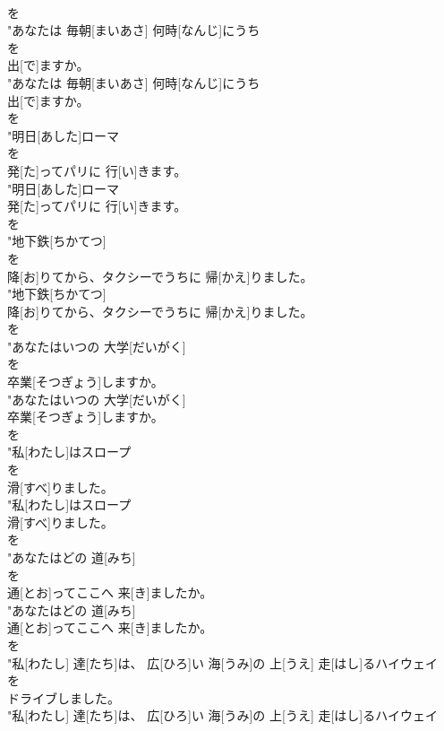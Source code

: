 \documentclass[8pt]{extreport}
\begin{document}
\begin{CJK}{UTF8}{min}
\\	を
\\	"あなたは 毎朝[まいあさ] 何時[なんじ]にうち
\\	を
\\	出[で]ますか。
\\	"あなたは 毎朝[まいあさ] 何時[なんじ]にうち
\\	出[で]ますか。
\\	を
\\	"明日[あした]ローマ
\\	を
\\	発[た]ってパリに 行[い]きます。
\\	"明日[あした]ローマ
\\	発[た]ってパリに 行[い]きます。
\\	を
\\	"地下鉄[ちかてつ]
\\	を
\\	降[お]りてから、タクシーでうちに 帰[かえ]りました。
\\	"地下鉄[ちかてつ]
\\	降[お]りてから、タクシーでうちに 帰[かえ]りました。
\\	を
\\	"あなたはいつの 大学[だいがく]
\\	を
\\	卒業[そつぎょう]しますか。
\\	"あなたはいつの 大学[だいがく]
\\	卒業[そつぎょう]しますか。
\\	を
\\	"私[わたし]はスロープ
\\	を
\\	滑[すべ]りました。
\\	"私[わたし]はスロープ
\\	滑[すべ]りました。
\\	を
\\	"あなたはどの 道[みち]
\\	を
\\	通[とお]ってここへ 来[き]ましたか。
\\	"あなたはどの 道[みち]
\\	通[とお]ってここへ 来[き]ましたか。
\\	を
\\	"私[わたし] 達[たち]は、 広[ひろ]い 海[うみ]の 上[うえ] 走[はし]るハイウェイ
\\	を
\\	ドライブしました。
\\	"私[わたし] 達[たち]は、 広[ひろ]い 海[うみ]の 上[うえ] 走[はし]るハイウェイ

\end{CJK}
\end{document}
